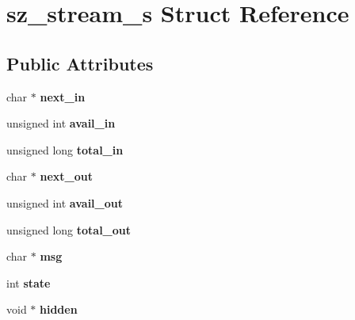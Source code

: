 \hypertarget{structsz__stream__s}{}\section{sz\+\_\+stream\+\_\+s Struct Reference}
\label{structsz__stream__s}
\subsection*{Public Attributes}
\begin{DoxyCompactItemize}
\item 
\mbox{\label{structsz__stream__s_a5e7f66e5e1f554b5684d26dd912f4edf}} 
char $\ast$ {\bfseries next\+\_\+in}
\item 
\mbox{\label{structsz__stream__s_a91fe818eb8c19d368fd7d4565abddb00}} 
unsigned int {\bfseries avail\+\_\+in}
\item 
\mbox{\label{structsz__stream__s_a30ec09ebd5c1538bc9d355e07679ad03}} 
unsigned long {\bfseries total\+\_\+in}
\item 
\mbox{\label{structsz__stream__s_a02916cdc78501449d54669527ae3ef42}} 
char $\ast$ {\bfseries next\+\_\+out}
\item 
\mbox{\label{structsz__stream__s_a7cce0465f2ec1afff2af30fb532bcead}} 
unsigned int {\bfseries avail\+\_\+out}
\item 
\mbox{\label{structsz__stream__s_acbb52de9cefe12f731995df0be67542b}} 
unsigned long {\bfseries total\+\_\+out}
\item 
\mbox{\label{structsz__stream__s_a2d13ded8f27cc28ebae73eaf90e41a4d}} 
char $\ast$ {\bfseries msg}
\item 
\mbox{\label{structsz__stream__s_a30e6d9d45276664588381ddfafeed7fe}} 
int {\bfseries state}
\item 
\mbox{\label{structsz__stream__s_a78808efa20c56857dd1cbb02fdc9080a}} 
void $\ast$ {\bfseries hidden}
\item 

\end{DoxyCompactItemize}
